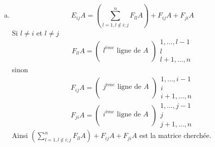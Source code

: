 \begin{enumerate}[a)]
  \item $$E_{ij} A = \left( \sum_{l=1, l \notin {i; j}}^n F_{ll} A \right) + F_{ij} A + F_{ji} A$$
    Si $l\neq i$ et $l\neq j$ 
    $$F_{ll} A =
      \begin{pmatrix}
        \\ l^{ème} \text{ ligne de } A \\ \\
      \end{pmatrix} 
      \begin{array}{c} 
        1, \ldots, l-1 \\ l \\ l+1, \ldots, n 
      \end{array}$$
    sinon
      $$F_{ij} A =
      \begin{pmatrix}
        \\ j^{ème} \text{ ligne de } A \\ \\
      \end{pmatrix} 
      \begin{array}{c} 
        1, \ldots, i-1 \\ i \\ i+1, \ldots, n 
      \end{array}$$
      $$F_{ji} A =
      \begin{pmatrix}
        \\ i^{ème} \text{ ligne de } A \\ \\
      \end{pmatrix} 
      \begin{array}{c} 
        1, \ldots, j-1 \\ j \\ j+1, \ldots, n 
      \end{array}$$
    Ainsi $\left( \sum_{l=1, l \notin {i; j}}^{n} F_{ll} A \right) + F_{ij} A + F_{ji} A$ est la matrice cherchée.
\end{enumerate}

